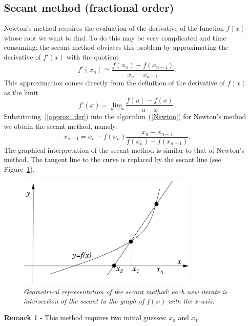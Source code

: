 \subsection{Secant method (fractional order)}

Newton's method requires the evaluation of the derivative of the
function $f(x)$ whose root we want to find.  To do this may be very
complicated and time consuming: the secant method obviates this
problem by approximating the derivative of $f'(x)$ with the quotient
%
\begin{equation}
  f'(x_n) \simeq
  \frac{f \left (x_n \right ) - f \left ( x_{n-1} \right )}
  {x_n - x_{n-1}} .
  \label{approx_der}
\end{equation}
%
This approximation comes directly from the definition of the derivative
of $f(x)$ as the limit
%
\begin{equation*}
  f'(x) = \lim_{u \to x} \frac{f(u)-f(x)}{u-x} .
\end{equation*}
%
Substituting~(\ref{approx_der}) into the algorithm~(\ref{Newton}) for
Newton's method we obtain the secant method, namely:
%
\begin{equation}
  x_{n+1} = x_n -
  f(x_n) \frac{x_n - x_{n-1}}{f(x_n) - f (x_{n-1})} .
  \label{secant}
\end{equation}
%
The graphical interpretation of the secant method is similar to that
of Newton's method.  The tangent line to the curve is replaced by the
secant line (see Figure~\ref{fig:secant}).

\begin{figure}
  \centerline{\includegraphics[width=90mm]{figures/secant}}
  \caption{\label{fig:secant} \it Geometrical representation of the
    secant method: each new iterate is intersection of the secant to
    the graph of $f(x)$ with the $x$-axis.}
\end{figure}

\noindent
\textbf{Remark 1} - This method requires two initial guesses:
$x_0$ and $x_1$.

